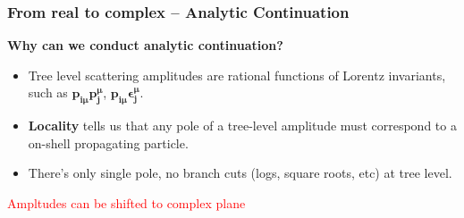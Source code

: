 \documentclass{beamer}
\begin{document}
\begin{frame}
    \frametitle{From real to complex -- Analytic Continuation}
    \textbf{Why can we conduct analytic continuation?}
\begin{itemize}
  \item Tree level scattering amplitudes are rational functions of Lorentz invariants, such as $\bm{p_{i\mu}p_j^\mu}$, $\bm{p_{i\mu}\epsilon_j^\mu}$.
  \item \textbf{Locality} tells us that any pole of a tree-level amplitude must correspond to a on-shell propagating particle. 
  \item There's only single pole, no branch cuts (logs, square roots, etc) at tree level.
\end{itemize}
    \begin{center}
    \end{center}
\vspace{0.5em}
\centering
\textcolor{red}{Ampltudes can be shifted to complex plane}
\end{frame}
\end{document}
